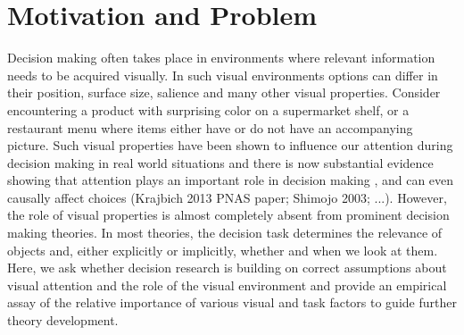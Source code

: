 \documentclass{article}
\begin{document}
\section{Motivation and Problem}
Decision making often takes place in environments where relevant information needs to be acquired visually. In such visual environments options can differ in their position, surface size, salience and many other visual properties. Consider encountering a product with surprising color on a  supermarket shelf, or a restaurant menu where items either have or do not have an accompanying picture. Such visual properties have been shown to influence our attention during decision making in real world situations and there is now substantial evidence showing that attention plays an important role in decision making \cite{gidloef2017a}, and can even causally affect choices (Krajbich 2013 PNAS paper; Shimojo 2003; ...). However, the role of visual properties is almost completely absent from prominent decision making theories. In most theories, the decision task determines the relevance of objects and, either explicitly or implicitly, whether and when we look at them. Here, we ask whether decision research is building on correct assumptions about visual attention and the role of the visual environment and provide an empirical assay of the relative importance of various visual and task factors to guide further theory development.
\end{document}

